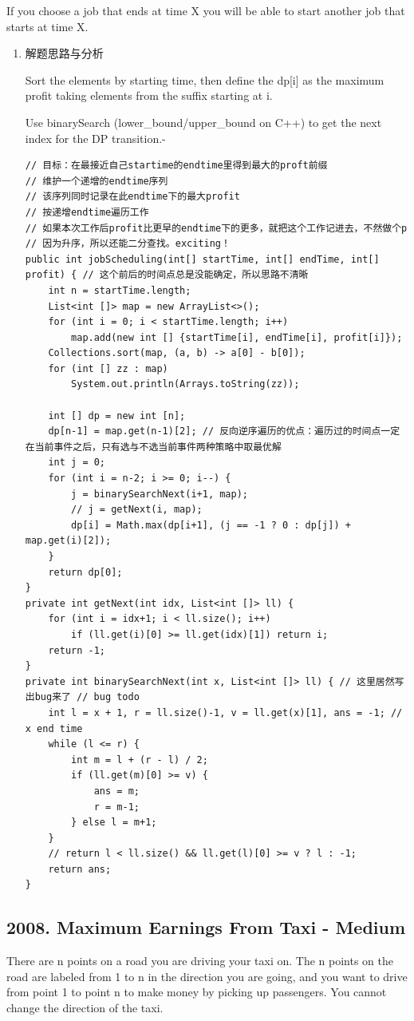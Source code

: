 \documentclass[9pt, b5paaper]{book}
\begin{document}
If you choose a job that ends at time X you will be able to start another job that starts at time X.
\begin{enumerate}
\item 解题思路与分析
\label{sec-1-4-3-1}

Sort the elements by starting time, then define the dp[i] as the maximum profit taking elements from the suffix starting at i.

Use binarySearch (lower\_bound/upper\_bound on C++) to get the next index for the DP transition.- 

\begin{verbatim}
// 目标：在最接近自己startime的endtime里得到最大的proft前缀
// 维护一个递增的endtime序列
// 该序列同时记录在此endtime下的最大profit
// 按递增endtime遍历工作
// 如果本次工作后profit比更早的endtime下的更多，就把这个工作记进去，不然做个p
// 因为升序，所以还能二分查找。exciting！
public int jobScheduling(int[] startTime, int[] endTime, int[] profit) { // 这个前后的时间点总是没能确定，所以思路不清晰
    int n = startTime.length;
    List<int []> map = new ArrayList<>();
    for (int i = 0; i < startTime.length; i++) 
        map.add(new int [] {startTime[i], endTime[i], profit[i]});
    Collections.sort(map, (a, b) -> a[0] - b[0]);
    for (int [] zz : map) 
        System.out.println(Arrays.toString(zz));

    int [] dp = new int [n];
    dp[n-1] = map.get(n-1)[2]; // 反向逆序遍历的优点：遍历过的时间点一定在当前事件之后，只有选与不选当前事件两种策略中取最优解
    int j = 0;
    for (int i = n-2; i >= 0; i--) {
        j = binarySearchNext(i+1, map);
        // j = getNext(i, map);
        dp[i] = Math.max(dp[i+1], (j == -1 ? 0 : dp[j]) + map.get(i)[2]);
    }
    return dp[0];
}
private int getNext(int idx, List<int []> ll) {
    for (int i = idx+1; i < ll.size(); i++) 
        if (ll.get(i)[0] >= ll.get(idx)[1]) return i;
    return -1;
}
private int binarySearchNext(int x, List<int []> ll) { // 这里居然写出bug来了 // bug todo
    int l = x + 1, r = ll.size()-1, v = ll.get(x)[1], ans = -1; // x end time
    while (l <= r) {
        int m = l + (r - l) / 2;
        if (ll.get(m)[0] >= v) {
            ans = m;
            r = m-1;
        } else l = m+1;
    }
    // return l < ll.size() && ll.get(l)[0] >= v ? l : -1;
    return ans;
}
\end{verbatim}
\end{enumerate}
\subsection{2008. Maximum Earnings From Taxi - Medium}
\label{sec-1-4-4}
There are n points on a road you are driving your taxi on. The n points on the road are labeled from 1 to n in the direction you are going, and you want to drive from point 1 to point n to make money by picking up passengers. You cannot change the direction of the taxi.
\end{document}
